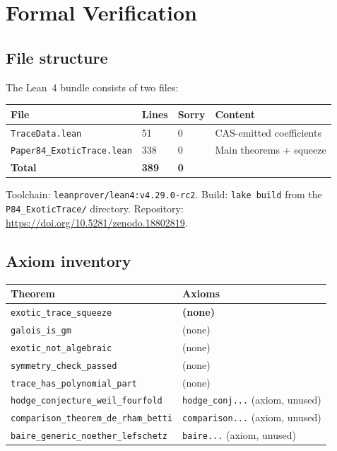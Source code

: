 \documentclass[11pt]{article}
\theoremstyle{plain}
\theoremstyle{definition}
\theoremstyle{remark}
\newcommand{\leanRepo}{\url{https://doi.org/10.5281/zenodo.18802819}}
\begin{document}
\section{Formal Verification}

\subsection{File structure}

The Lean~4 bundle consists of two files:

\medskip
\begin{tabular}{@{}llll@{}}
\toprule
\textbf{File} & \textbf{Lines} & \textbf{Sorry} & \textbf{Content} \\
\midrule
\texttt{TraceData.lean} & 51 & 0 & CAS-emitted coefficients \\
\texttt{Paper84\_ExoticTrace.lean} & 338 & 0 & Main theorems + squeeze \\
\midrule
\textbf{Total} & \textbf{389} & \textbf{0} & \\
\bottomrule
\end{tabular}

\medskip\noindent
Toolchain: \texttt{leanprover/lean4:v4.29.0-rc2}. Build: \texttt{lake build}
from the \texttt{P84\_ExoticTrace/} directory.
Repository: \leanRepo.

\subsection{Axiom inventory}

\begin{tabular}{@{}ll@{}}
\toprule
\textbf{Theorem} & \textbf{Axioms} \\
\midrule
\texttt{exotic\_trace\_squeeze} & \textbf{(none)} \\
\texttt{galois\_is\_gm} & (none) \\
\texttt{exotic\_not\_algebraic} & (none) \\
\texttt{symmetry\_check\_passed} & (none) \\
\texttt{trace\_has\_polynomial\_part} & (none) \\
\midrule
\texttt{hodge\_conjecture\_weil\_fourfold} & \texttt{hodge\_conj...} (axiom, unused) \\
\texttt{comparison\_theorem\_de\_rham\_betti} & \texttt{comparison...} (axiom, unused) \\
\texttt{baire\_generic\_noether\_lefschetz} & \texttt{baire...} (axiom, unused) \\
\bottomrule
\end{tabular}
\end{document}
